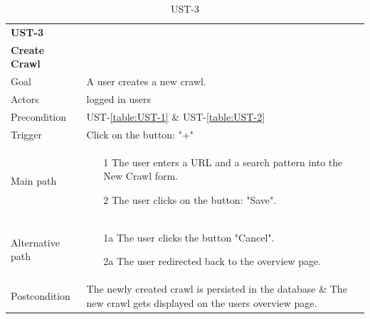\documentclass[titlepage, 12pt]{article}
\begin{document}
\begin{table}[H]
    \begin{center}
  
      \begin{tabular}{p{4cm}|p{10cm}}
        \textbf{UST-3}\\ \textbf{Create Crawl}                                            \\
        \hline
        Goal             & A user creates a new crawl.                  \\
        \hline
        Actors           & logged in users                                               \\
        \hline
        Precondition     & UST-\ref{table:UST-1} \& UST-\ref{table:UST-2}                \\
        \hline
        Trigger          & Click on the button: "+"                                   \\
        \hline
        Main path        &
        \begin{itemize}
          \item [1] The user enters a URL and a search pattern into the New Crawl form.
          \item [2] The user clicks on the button: "Save".
        \end{itemize}                                                         \\
        \hline
        Alternative path &
        \begin{itemize}
          \item [1a] The user clicks the button "Cancel".
          \item [2a] The user redirected back to the overview page.
        \end{itemize}                                                         \\
        \hline
        Postcondition    & The newly created crawl is persisted in the database \& The new crawl gets displayed on the users overview page. \\
      \end{tabular}
  
      \caption{UST-3}
      \label{table:UST-3}
  
    \end{center}
  \end{table}
\end{document}

